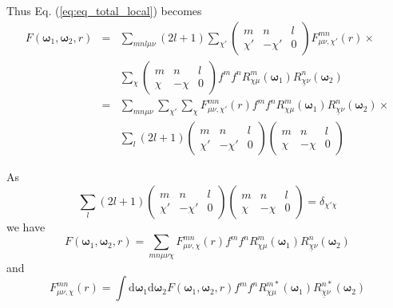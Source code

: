 Thus Eq. (\ref{eq:eq_total_local}) becomes
\begin{eqnarray}
F(\boldsymbol{\omega}_{1},\boldsymbol{\omega}_{2},r) & = & \sum_{mnl\mu\nu}\left(2l+1\right)\sum_{\chi'}\left(\begin{array}{ccc}
m & n & l\\
\chi' & -\chi' & 0
\end{array}\right)F_{\mu\nu,\chi'}^{mn}(r)\times\nonumber \\
 &  & \sum_{\chi}\left(\begin{array}{ccc}
m & n & l\\
\chi & -\chi & 0
\end{array}\right)f^{m}f^{n}R_{\chi\mu}^{m}(\boldsymbol{\omega}_{1})R_{\underline{\chi}\nu}^{n}(\boldsymbol{\omega}_{2})\nonumber \\
 & = & \sum_{mn\mu\nu}\sum_{\chi'}\sum_{\chi}F_{\mu\nu,\chi'}^{mn}(r)f^{m}f^{n}R_{\chi\mu}^{m}(\boldsymbol{\omega}_{1})R_{\underline{\chi}\nu}^{n}(\boldsymbol{\omega}_{2})\times\nonumber \\
 &  & \sum_{l}\left(2l+1\right)\left(\begin{array}{ccc}
m & n & l\\
\chi' & -\chi' & 0
\end{array}\right)\left(\begin{array}{ccc}
m & n & l\\
\chi & -\chi & 0
\end{array}\right)
\end{eqnarray}

As
\begin{equation}
\sum_{l}\left(2l+1\right)\left(\begin{array}{ccc}
m & n & l\\
\chi' & -\chi' & 0
\end{array}\right)\left(\begin{array}{ccc}
m & n & l\\
\chi & -\chi & 0
\end{array}\right)=\delta_{\chi'\chi}
\end{equation}
we have
\begin{equation}
F(\boldsymbol{\omega}_{1},\boldsymbol{\omega}_{2},r)=\sum_{mn\mu\nu\chi}F_{\mu\nu,\chi}^{mn}(r)f^{m}f^{n}R_{\chi\mu}^{m}(\boldsymbol{\omega}_{1})R_{\underline{\chi}\nu}^{n}(\boldsymbol{\omega}_{2})\label{eq:local-forward}
\end{equation}
and
\begin{equation}
F_{\mu\nu,\chi}^{mn}(r)=\int\mathrm{d}\boldsymbol{\omega}_{1}\mathrm{d}\boldsymbol{\omega}_{2}F(\boldsymbol{\omega}_{1},\boldsymbol{\omega}_{2},r)f^{m}f^{n}R_{\chi\mu}^{m*}(\boldsymbol{\omega}_{1})R_{\underline{\chi}\nu}^{n*}(\boldsymbol{\omega}_{2})\label{eq:local_backward}
\end{equation}

